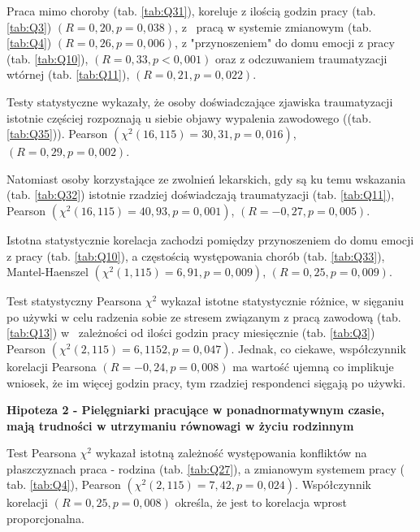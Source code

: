 \documentclass[a4paper,12pt,twoside,openright]{mwrep}
\begin{document}
Praca mimo choroby (tab. \ref{tab:Q31}), koreluje z ilością godzin pracy (tab. \ref{tab:Q3}) $(R = 0,20, p = 0,038)$, z ~pracą w systemie zmianowym (tab. \ref{tab:Q4}) $(R = 0,26, p = 0,006)$, z "przynoszeniem" do domu emocji z pracy (tab. \ref{tab:Q10}), $(R = 0,33, p < 0,001)$ oraz z odczuwaniem traumatyzacji wtórnej  (tab. \ref{tab:Q11}), $(R = 0,21, p = 0,022)$.

Testy statystyczne wykazały, że osoby doświadczające zjawiska traumatyzacji istotnie  częściej rozpoznają u siebie objawy wypalenia zawodowego ((tab. \ref{tab:Q35})).
Pearson $(\chi^2 (16, 115) = 30,31, p=0,016)$, $(R = 0,29, p = 0,002)$.


Natomiast osoby korzystające ze zwolnień lekarskich, gdy są ku temu wskazania (tab. \ref{tab:Q32}) istotnie  rzadziej doświadczają traumatyzacji (tab. \ref{tab:Q11}), Pearson $(\chi^2 (16, 115) = 40,93, p=0,001)$, $(R = -0,27, p = 0,005)$.


Istotna statystycznie korelacja zachodzi pomiędzy przynoszeniem do domu emocji z pracy (tab. \ref{tab:Q10}), a częstością występowania chorób  (tab. \ref{tab:Q33}), Mantel-Haenszel $(\chi^2 (1, 115) = 6,91, p=0,009)$, $(R = 0,25, p = 0,009)$.

Test statystyczny Pearsona $\chi^2$ wykazał istotne statystycznie różnice, w sięganiu po używki w celu radzenia sobie ze stresem związanym z pracą zawodową  (tab. \ref{tab:Q13}) w ~zależności od ilości godzin pracy miesięcznie (tab. \ref{tab:Q3}) Pearson $(\chi^2 (2, 115) = 6,1152, p=0,047)$. Jednak, co ciekawe, współczynnik korelacji Pearsona $(R = -0,24, p = 0,008)$ ma wartość ujemną co implikuje wniosek, że im więcej godzin pracy, tym rzadziej respondenci sięgają po używki.



 
\vspace{\baselineskip} 
\textbf{Hipoteza 2 - Pielęgniarki pracujące w ponadnormatywnym czasie,  mają  trudności w utrzymaniu równowagi w życiu  rodzinnym }
\vspace{\baselineskip} 


	Test Pearsona $\chi^2$ wykazał istotną zależność występowania konfliktów na płaszczyznach praca - rodzina (tab. \ref{tab:Q27}), a zmianowym systemem pracy ( tab. \ref{tab:Q4}), Pearson $(\chi^2 (2, 115) = 7,42, p = 0,024)$. Współczynnik korelacji $(R = 0,25, p = 0,008)$ określa, że jest to korelacja wprost proporcjonalna.
	
\end{document}
